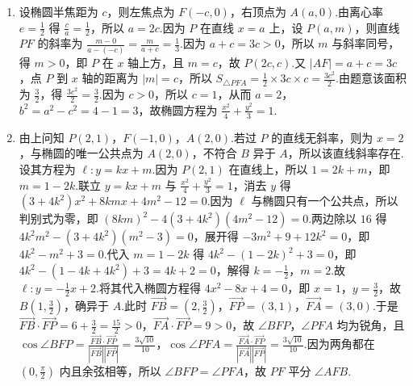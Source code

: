 \documentclass[UTF8,a4paper,oneside,11pt]{ctexbook}
\begin{document}
\begin{solution}
\begin{enumerate}
\item 设椭圆半焦距为 \(c\)，则左焦点为 \(F\left(-c,0\right)\)，右顶点为 \(A\left(a,0\right)\).由离心率 \(e=\frac12\) 得 \(\frac{c}{a}=\frac12\)，所以 \(a=2c\).因为 \(P\) 在直线 \(x=a\) 上，设 \(P\left(a,m\right)\)，则直线 \(PF\) 的斜率为 \(\frac{m-0}{a-\left(-c\right)}=\frac{m}{a+c}=\frac13\).因为 \(a+c=3c>0\)，所以 \(m\) 与斜率同号，得 \(m>0\)，即 \(P\) 在 \(x\) 轴上方，且 \(m=c\)，故 \(P\left(2c,c\right)\).又 \(\left|AF\right|=a+c=3c\)，点 \(P\) 到 \(x\) 轴的距离为 \(\left|m\right|=c\)，所以 \(S_{\triangle PFA}=\frac12\times 3c\times c=\frac{3c^2}{2}\).由题意该面积为 \(\frac32\)，得 \(\frac{3c^2}{2}=\frac32\).因为 \(c>0\)，所以 \(c=1\)，从而 \(a=2\)，\(b^2=a^2-c^2=4-1=3\)，故椭圆方程为 \(\frac{x^2}{4}+\frac{y^2}{3}=1\).
\item 由上问知 \(P\left(2,1\right)\)，\(F\left(-1,0\right)\)，\(A\left(2,0\right)\).若过 \(P\) 的直线无斜率，则为 \(x=2\)，与椭圆的唯一公共点为 \(A\left(2,0\right)\)，不符合 \(B\) 异于 \(A\)，所以该直线斜率存在.设其方程为 \(\ell:y=kx+m\).因为 \(P\left(2,1\right)\) 在直线上，所以 \(1=2k+m\)，即 \(m=1-2k\).联立 \(y=kx+m\) 与 \(\frac{x^2}{4}+\frac{y^2}{3}=1\)，消去 \(y\) 得 \(\left(3+4k^2\right)x^2+8kmx+4m^2-12=0\).因为 \(\ell\) 与椭圆只有一个公共点，所以判别式为零，即 \(\left(8km\right)^2-4\left(3+4k^2\right)\left(4m^2-12\right)=0\).两边除以 \(16\) 得 \(4k^2m^2-\left(3+4k^2\right)\left(m^2-3\right)=0\)，展开得 \(-3m^2+9+12k^2=0\)，即 \(4k^2-m^2+3=0\).代入 \(m=1-2k\) 得 \(4k^2-\left(1-2k\right)^2+3=0\)，即 \(4k^2-\left(1-4k+4k^2\right)+3=4k+2=0\)，解得 \(k=-\frac12\)，\(m=2\).故 \(\ell:y=-\frac12x+2\).将其代入椭圆方程得 \(4x^2-8x+4=0\)，即 \(x=1\)，\(y=\frac32\)，故 \(B\left(1,\frac32\right)\)，确异于 \(A\).此时 \(\overrightarrow{FB}=\left(2,\frac32\right)\)，\(\overrightarrow{FP}=\left(3,1\right)\)，\(\overrightarrow{FA}=\left(3,0\right)\).于是 \(\overrightarrow{FB}\cdot\overrightarrow{FP}=6+\frac32=\frac{15}{2}>0\)，\(\overrightarrow{FA}\cdot\overrightarrow{FP}=9>0\)，故 \(\angle BFP\)，\(\angle PFA\) 均为锐角，且 \(\cos\angle BFP=\frac{\overrightarrow{FB}\cdot\overrightarrow{FP}}{\left|\overrightarrow{FB}\right|\left|\overrightarrow{FP}\right|}=\frac{3\sqrt{10}}{10}\)，\(\cos\angle PFA=\frac{\overrightarrow{FA}\cdot\overrightarrow{FP}}{\left|\overrightarrow{FA}\right|\left|\overrightarrow{FP}\right|}=\frac{3\sqrt{10}}{10}\).因为两角都在 \(\left(0,\frac{\pi}{2}\right)\) 内且余弦相等，所以 \(\angle BFP=\angle PFA\)，故 \(PF\) 平分 \(\angle AFB\).
\end{enumerate}
\end{solution}
\end{document}
